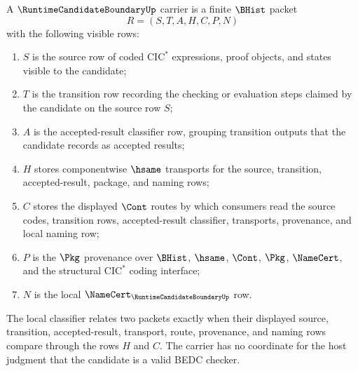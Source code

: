 \begin{definition}
\label{def:runtime-candidate-boundary-carrier}
A $\RuntimeCandidateBoundaryUp$ carrier is a finite $\BHist$ packet
$$
R=(S,T,A,H,C,P,N)
$$
with the following visible rows:
\begin{enumerate}
\item $S$ is the source row of coded $\mathrm{CIC}^{*}$ expressions, proof objects, and states visible to the candidate;
\item $T$ is the transition row recording the checking or evaluation steps claimed by the candidate on the source row $S$;
\item $A$ is the accepted-result classifier row, grouping transition outputs that the candidate records as accepted results;
\item $H$ stores componentwise $\hsame$ transports for the source, transition, accepted-result, package, and naming rows;
\item $C$ stores the displayed $\Cont$ routes by which consumers read the source codes, transition rows, accepted-result classifier, transports, provenance, and local naming row;
\item $P$ is the $\Pkg$ provenance over $\BHist$, $\hsame$, $\Cont$, $\Pkg$, $\NameCert$, and the structural $\mathrm{CIC}^{*}$ coding interface;
\item $N$ is the local $\NameCert_{\RuntimeCandidateBoundaryUp}$ row.
\end{enumerate}
The local classifier relates two packets exactly when their displayed source, transition, accepted-result, transport, route, provenance, and naming rows compare through the rows $H$ and $C$. The carrier has no coordinate for the host judgment that the candidate is a valid BEDC checker.
\end{definition}

